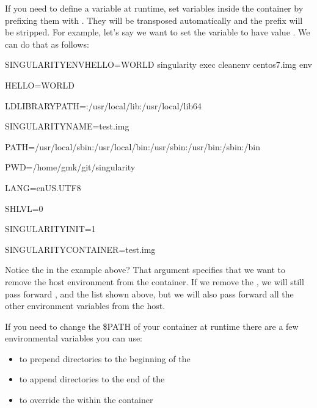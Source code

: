 \documentclass[letterpaper,10pt,english]{sphinxmanual}
\begin{document}
If you need to define a variable at runtime, set variables inside the
container by prefixing them with . They will be
transposed automatically and the prefix will be stripped. For example,
let’s say we want to set the variable  to have value . We can do that
as follows:

%
\begin{sphinxVerbatim}[commandchars=\\\{\}]
\PYGZdl{} SINGULARITYENV\PYGZus{}HELLO=WORLD singularity exec \PYGZhy{}\PYGZhy{}cleanenv centos7.img env

HELLO=WORLD

LD\PYGZus{}LIBRARY\PYGZus{}PATH=:/usr/local/lib:/usr/local/lib64

SINGULARITY\PYGZus{}NAME=test.img

PATH=/usr/local/sbin:/usr/local/bin:/usr/sbin:/usr/bin:/sbin:/bin

PWD=/home/gmk/git/singularity

LANG=en\PYGZus{}US.UTF\PYGZhy{}8

SHLVL=0

SINGULARITY\PYGZus{}INIT=1

SINGULARITY\PYGZus{}CONTAINER=test.img
\end{sphinxVerbatim}

Notice the  in the example above? That argument specifies that we want
to remove the host environment from the container. If we remove the ,
we will still pass forward , and the list shown above, but we will
also pass forward all the other environment variables from the host.

If you need to change the \$PATH of your container at runtime there are
a few environmental variables you can use:
\begin{itemize}
\item {} 
 to prepend directories to the beginning of the 

\item {} 
 to append directories to the end of the 

\item {} 
 to override the  within the container

\end{itemize}
\end{document}
